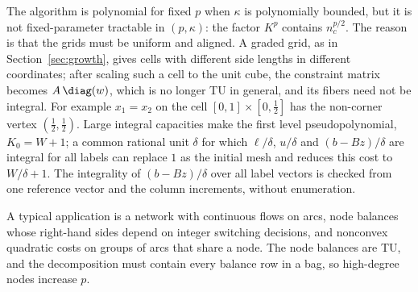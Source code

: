 The algorithm is polynomial for fixed $p$ when $\kappa$ is polynomially
bounded, but it is not fixed-parameter tractable in $(p,\kappa)$: the factor
$K^p$ contains $n_c^{p/2}$. The reason is that the grids must be uniform and
aligned. A graded grid, as in Section~\ref{sec:growth}, gives cells with
different side lengths in different coordinates; after scaling such a cell to
the unit cube, the constraint matrix becomes $A\,\diag(w)$, which is no
longer TU in general, and its fibers need not be integral. For example
$x_1=x_2$ on the cell $[0,1]\times[0,\frac12]$ has the non-corner vertex
$(\frac12,\frac12)$. Large integral capacities make the first level
pseudopolynomial, $K_0=W+1$; a common rational unit $\delta$ for which
$\ell/\delta$, $u/\delta$ and $(b-Bz)/\delta$ are integral for all labels
can replace $1$ as the initial mesh and reduces this cost to $W/\delta+1$.
The integrality of $(b-Bz)/\delta$ over all label vectors is checked from
one reference vector and the column increments, without enumeration.

A typical application is a network with continuous flows on arcs, node
balances whose right-hand sides depend on integer switching decisions,
and nonconvex quadratic costs on groups of arcs that share a node. The node
balances are TU, and the decomposition must contain every balance row in a
bag, so high-degree nodes increase $p$.

